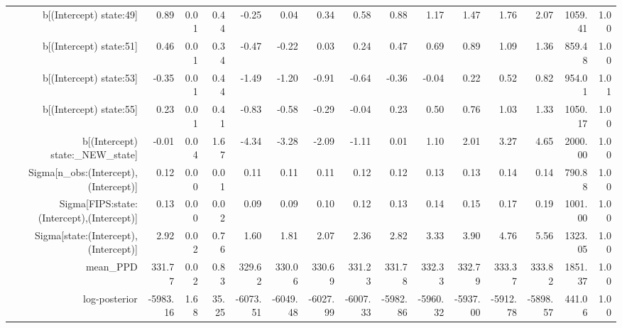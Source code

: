 \begin{table}[ht]
\begin{tabular}{rrrrrrrrrrrrrrr}
  b[(Intercept) state:49] & 0.89 & 0.01 & 0.44 & -0.25 & 0.04 & 0.34 & 0.58 & 0.88 & 1.17 & 1.47 & 1.76 & 2.07 & 1059.41 & 1.00 \\ 
  b[(Intercept) state:51] & 0.46 & 0.01 & 0.34 & -0.47 & -0.22 & 0.03 & 0.24 & 0.47 & 0.69 & 0.89 & 1.09 & 1.36 & 859.48 & 1.00 \\ 
  b[(Intercept) state:53] & -0.35 & 0.01 & 0.44 & -1.49 & -1.20 & -0.91 & -0.64 & -0.36 & -0.04 & 0.22 & 0.52 & 0.82 & 954.01 & 1.01 \\ 
  b[(Intercept) state:55] & 0.23 & 0.01 & 0.41 & -0.83 & -0.58 & -0.29 & -0.04 & 0.23 & 0.50 & 0.76 & 1.03 & 1.33 & 1050.17 & 1.00 \\ 
  b[(Intercept) state:\_NEW\_state] & -0.01 & 0.04 & 1.67 & -4.34 & -3.28 & -2.09 & -1.11 & 0.01 & 1.10 & 2.01 & 3.27 & 4.65 & 2000.00 & 1.00 \\ 
  Sigma[n\_obs:(Intercept),(Intercept)] & 0.12 & 0.00 & 0.01 & 0.11 & 0.11 & 0.11 & 0.12 & 0.12 & 0.13 & 0.13 & 0.14 & 0.14 & 790.88 & 1.00 \\ 
  Sigma[FIPS:state:(Intercept),(Intercept)] & 0.13 & 0.00 & 0.02 & 0.09 & 0.09 & 0.10 & 0.12 & 0.13 & 0.14 & 0.15 & 0.17 & 0.19 & 1001.00 & 1.00 \\ 
  Sigma[state:(Intercept),(Intercept)] & 2.92 & 0.02 & 0.76 & 1.60 & 1.81 & 2.07 & 2.36 & 2.82 & 3.33 & 3.90 & 4.76 & 5.56 & 1323.05 & 1.00 \\ 
  mean\_PPD & 331.77 & 0.02 & 0.83 & 329.62 & 330.06 & 330.69 & 331.23 & 331.78 & 332.33 & 332.79 & 333.37 & 333.82 & 1851.37 & 1.00 \\ 
  log-posterior & -5983.16 & 1.68 & 35.25 & -6073.51 & -6049.48 & -6027.99 & -6007.33 & -5982.86 & -5960.32 & -5937.00 & -5912.78 & -5898.57 & 441.06 & 1.00 \\ 
   \hline
\end{tabular}
\end{table}
